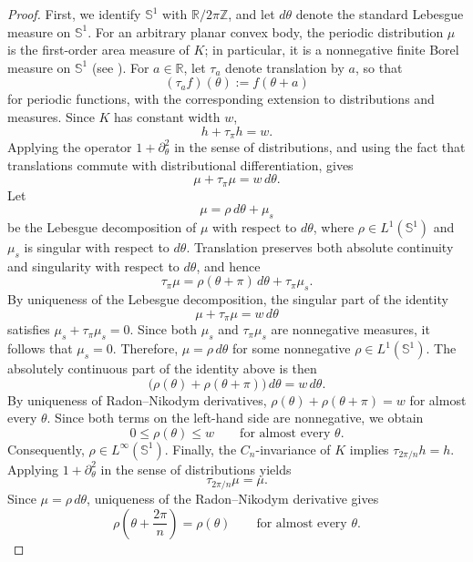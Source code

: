 \documentclass[11pt,letterpaper,reqno]{amsart}
\begin{document}
\begin{proof}
First, we identify \(\mathbb S^1\) with \(\mathbb{R}/2\pi\mathbb{Z}\), and let
\(d\theta\) denote the standard Lebesgue measure on \(\mathbb S^1\). For an
arbitrary planar convex body, the periodic distribution
$
\mu
$
is the first-order area measure of \(K\); in particular, it is a
nonnegative finite Borel measure on \(\mathbb S^1\) (see
\cite[Theorem~4.2.1 %
]{Schneider2014}).
For \(a\in\mathbb{R}\), let \(\tau_a\) denote translation by \(a\), so
that
\[
(\tau_a f)(\theta):=f(\theta+a)
\]
for periodic functions, with the corresponding extension to
distributions and measures. Since \(K\) has constant width \(w\),
\[
h+\tau_\pi h=w.
\]
Applying the operator \(1+\partial_\theta^2\) in the sense of
distributions, and using the fact that translations commute with
distributional differentiation, gives
\[
\mu+\tau_\pi\mu=w\,d\theta.
\]
Let
\[
\mu=\rho\,d\theta+\mu_s
\]
be the Lebesgue decomposition of \(\mu\) with respect to \(d\theta\),
where \(\rho\in L^1(\mathbb S^1)\) and \(\mu_s\) is singular with respect to $d\theta$. Translation
preserves both absolute continuity and singularity with respect to
\(d\theta\), and hence
\[
\tau_\pi\mu
=
\rho(\theta+\pi)\,d\theta+\tau_\pi\mu_s.
\]
By uniqueness of the Lebesgue decomposition, the singular part of the
identity
\[
\mu+\tau_\pi\mu=w\,d\theta
\]
satisfies
\(
\mu_s+\tau_\pi\mu_s=0.
\)
Since both \(\mu_s\) and \(\tau_\pi\mu_s\) are nonnegative measures, it
follows that
$
\mu_s=0.
$
Therefore,
$
\mu=\rho\,d\theta
$
for some nonnegative \(\rho\in L^1(\mathbb S^1)\). The absolutely continuous
part of the identity above is then
\[
\bigl(\rho(\theta)+\rho(\theta+\pi)\bigr)\,d\theta
=
w\,d\theta.
\]
By uniqueness of Radon--Nikodym derivatives,
\(
\rho(\theta)+\rho(\theta+\pi)=w
\)
for almost every $\theta$.
Since both terms on the left-hand side are nonnegative, we obtain
\[
0\leq \rho(\theta)\leq w
\qquad\text{for almost every }\theta.
\]
Consequently,
$
\rho\in L^\infty(\mathbb S^1).
$
Finally, the \(C_n\)-invariance of \(K\) implies
$
\tau_{2\pi/n}h=h.
$
Applying \(1+\partial_\theta^2\) in the sense of distributions yields
\[
\tau_{2\pi/n}\mu=\mu.
\]
Since \(\mu=\rho\,d\theta\), uniqueness of the Radon--Nikodym derivative
gives
\[
\rho\left(\theta+\frac{2\pi}{n}\right)=\rho(\theta)
\qquad\text{for almost every }\theta.
\]
\end{proof}
\end{document}

